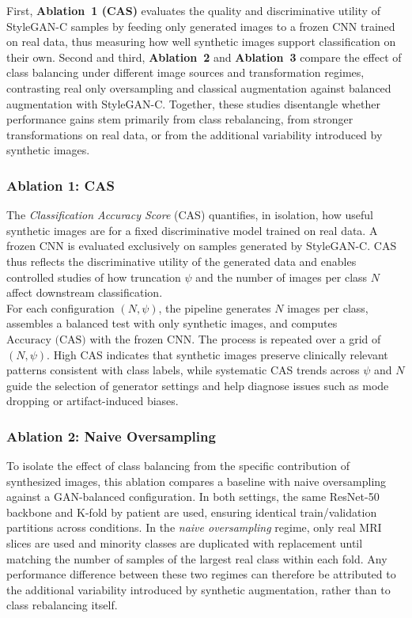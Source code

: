First, \textbf{Ablation~1 (CAS)} evaluates the quality and discriminative utility of StyleGAN-C samples by feeding only generated images to a frozen CNN trained on real data, thus measuring how well synthetic images support classification on their own. Second and third, \textbf{Ablation~2} and \textbf{Ablation~3} compare the effect of class balancing under different image sources and transformation regimes, contrasting real only oversampling and classical augmentation against balanced augmentation with StyleGAN-C. Together, these studies disentangle whether performance gains stem primarily from class rebalancing, from stronger transformations on real data, or from the additional variability introduced by synthetic images.




\subsubsection{Ablation 1: CAS}
The \textit{Classification Accuracy Score} (CAS) quantifies, in isolation, how useful synthetic images are for a fixed discriminative model trained on real data. A frozen CNN is evaluated exclusively on samples generated by StyleGAN-C. CAS thus reflects the discriminative utility of the generated data and enables controlled studies of how truncation \(\psi\) and the number of images per class \(N\) affect downstream classification.\\

For each configuration \((N,\psi)\), the pipeline generates \(N\) images per class, assembles a balanced test with only synthetic images, and computes \(\text{Accuracy (CAS)}\) with the frozen CNN. The process is repeated over a grid of \((N,\psi)\). High CAS indicates that synthetic images preserve clinically relevant patterns consistent with class labels, while systematic CAS trends across \(\psi\) and \(N\) guide the selection of generator settings and help diagnose issues such as mode dropping or artifact-induced biases.

\subsubsection{Ablation 2: Naive Oversampling}

To isolate the effect of class balancing from the specific contribution of synthesized images, this ablation compares a baseline with naive oversampling against a GAN-balanced configuration. In both settings, the same ResNet-50 backbone and K-fold by patient are used, ensuring identical train/validation partitions across conditions. In the \emph{naive oversampling} regime, only real MRI slices are used and minority classes are duplicated with replacement until matching the number of samples of the largest real class within each fold. Any performance difference between these two regimes can therefore be attributed to the additional variability introduced by synthetic augmentation, rather than to class rebalancing itself.


